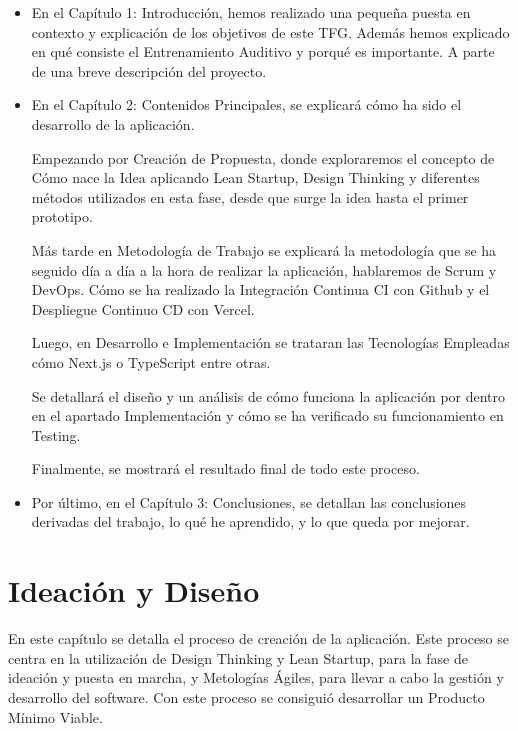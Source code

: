 \documentclass[12pt,twoside,titlepage]{report}
\newcommand\blankpage{%
    \newpage
    \null
    \thispagestyle{empty}%
    \newpage}
\begin{document}
\begin{itemize}

    \item En el Capítulo 1: Introducción, hemos realizado una pequeña puesta en contexto y explicación de los objetivos de este TFG. Además hemos explicado en qué consiste el Entrenamiento Auditivo y porqué es importante. A parte de una breve descripción del proyecto.
    \item En el Capítulo 2: Contenidos Principales, se explicará cómo ha sido el desarrollo de la aplicación.
    
    Empezando por Creación de Propuesta, donde exploraremos el concepto de Cómo nace la Idea aplicando Lean Startup, Design Thinking y diferentes métodos utilizados en esta fase, desde que surge la idea hasta el primer prototipo.

    Más tarde en Metodología de Trabajo se explicará la metodología que se ha seguido día a día a la hora de realizar la aplicación, hablaremos de Scrum y DevOps. Cómo se ha realizado la Integración Continua CI con Github y el Despliegue Continuo CD con Vercel.
    
    Luego, en Desarrollo e Implementación se trataran las Tecnologías Empleadas cómo Next.js o TypeScript entre otras. 
    
    Se detallará el diseño y un análisis de cómo funciona la aplicación por dentro en el apartado Implementación y cómo se ha verificado su funcionamiento en Testing. 
    
    Finalmente, se mostrará el resultado final de todo este proceso.
    \item Por último, en el Capítulo 3: Conclusiones, se detallan las conclusiones derivadas del trabajo, lo qué he aprendido, y lo que queda por mejorar.

\end{itemize}




\chapter{Ideación y Diseño}

En este capítulo se detalla el proceso de creación de la aplicación. Este proceso se centra en la utilización de Design Thinking y Lean Startup, para la fase de ideación y puesta en marcha, y Metologías Ágiles, para llevar a cabo la gestión y desarrollo del software. Con este proceso se consiguió desarrollar un Producto Mínimo Viable. 
\end{document}
